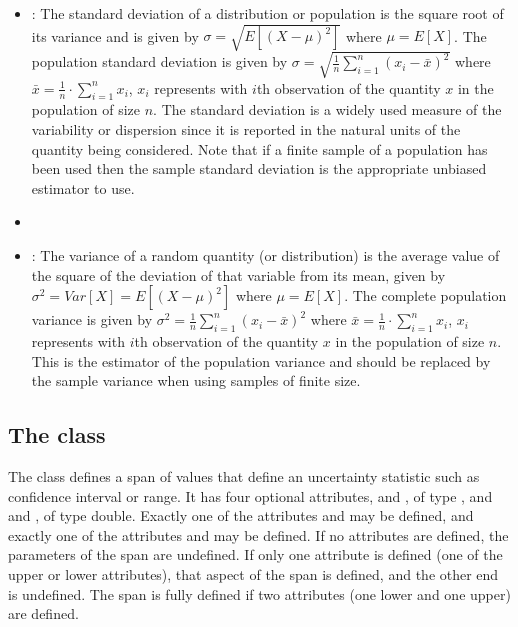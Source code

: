 \documentclass[draftspec]{sbmlpkgspec}
\newcommand{\UncertStatisticSpan}{\defRef{UncertStatisticSpan}{UncertStatisticSpan-class}}
\begin{document}
\begin{itemize}
\item {}:  The standard deviation of a distribution or population is the square root of its variance and is given by $ \sigma = \sqrt{E[(X - \mu)^2]} $ where $ \mu = E[X] $. The population standard deviation is given by $ \sigma = \sqrt{\frac{1}{n} \sum_{i=1}^n\left(x_i - \bar{x} \right)^2} $ where $ \bar{x} = \frac{1}{n}\cdot \sum_{i=1}^n{x_i} $, $ x_i $ represents with $ i $th observation of the quantity $ x $ in the population of size $ n $. The standard deviation is a widely used measure of the variability or dispersion since it is reported in the natural units of the quantity being considered. Note that if a finite sample of a population has been used then the sample standard deviation is the appropriate unbiased estimator to use.

\item {}

\item {}:  The variance of a random quantity (or distribution) is the average value of the square of the deviation of that variable from its mean, given by $ \sigma^2 = Var[X] = E[(X - \mu)^2] $ where $ \mu = E[X] $. The complete population variance is given by $ \sigma^2 = \frac{1}{n} \sum_{i=1}^n\left(x_i - \bar{x} \right)^2 $ where $ \bar{x} = \frac{1}{n}\cdot \sum_{i=1}^n{x_i} $, $ x_i $ represents with $ i $th observation of the quantity $ x $ in the population of size $ n $. This is the estimator of the population variance and should be replaced by the sample variance when using samples of finite size.


\end{itemize}

\subsection{The  class}
\label{UncertStatisticSpan-class}
\label{uncertstatisticspan-class}

The \UncertStatisticSpan class defines a span of values that define an uncertainty statistic such as confidence interval or range.  It has four optional attributes,  and , of type , and  and , of type double.  Exactly one of the attributes  and  may be defined, and exactly one of the attributes  and  may be defined.  If no attributes are defined, the parameters of the span are undefined.  If only one attribute is defined (one of the upper or lower attributes), that aspect of the span is defined, and the other end is undefined.  The span is fully defined if two attributes (one lower and one upper) are defined.
\end{document}
